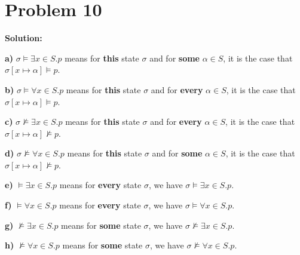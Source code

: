 \documentclass{article}
\begin{document}
\section*{Problem 10}
\textbf{Solution:}

\textbf{a)} $ \sigma \vDash \exists x \in S.p$ means for \textbf{this} state $ \sigma $ and for \textbf{some} $ \alpha \in S$, it is the case that $ \sigma[x \mapsto \alpha] \vDash p$.


\textbf{b)} $ \sigma \vDash \forall x \in S.p$ means for \textbf{this} state $ \sigma $ and for \textbf{every} $ \alpha \in S$, it is the case that $ \sigma[x \mapsto \alpha] \vDash p$.


\textbf{c)} $ \sigma \nvDash \exists x \in S.p$ means for \textbf{this} state $ \sigma $ and for \textbf{every} $ \alpha \in S$, it is the case that $ \sigma[x \mapsto \alpha] \nvDash p$.


\textbf{d)} $ \sigma \nvDash \forall x \in S.p$ means for \textbf{this} state $ \sigma $ and for \textbf{some} $ \alpha \in S$, it is the case that $ \sigma[x \mapsto \alpha] \nvDash p$.


\textbf{e)} $ \vDash \exists x \in S.p $ means for \textbf{every} state $\sigma$, we have $\sigma \vDash \exists x \in S.p $.


\textbf{f)} $ \vDash \forall x \in S.p $ means for \textbf{every} state $\sigma$, we have $\sigma \vDash \forall x \in S.p $.


\textbf{g)} $ \nvDash \exists x \in S.p $ means for \textbf{some} state $\sigma$, we have $\sigma \nvDash \exists x \in S.p $.


\textbf{h)} $ \nvDash \forall x \in S.p $ means for \textbf{some} state $\sigma$, we have $\sigma \nvDash \forall x \in S.p $.
\end{document}
